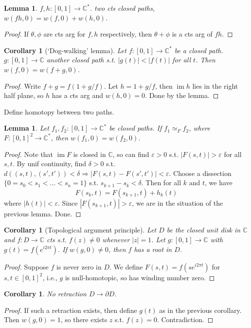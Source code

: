 \documentclass{article}
\theoremstyle{definition}
\theoremstyle{remark}
\theoremstyle{plain}
\newtheorem{lem}[defn]{Lemma}
\newtheorem{crly}[defn]{Corollary}
\newcommand{\CC}{\mathbb{C}}
\newcommand{\im}{\operatorname{im}}
\begin{document}
\begin{lem}
    $f,h:[0,1]\to\CC^\ast$. two cts closed paths, $w(fh,0)=w(f,0)+w(h,0)$.
\end{lem}
\begin{proof}
    If $\theta,\phi$ are cts arg for $f,h$ respectively, then $\theta+\phi$ is a cts arg of $fh$.
\end{proof}
\begin{crly}[`Dog-walking' lemma]
    Let $f:[0,1]\to\CC^\ast$ be a closed path. $g:[0,1]\to\CC$ another closed path s.t. $|g(t)|<|f(t)|$ for all $t$. Then $w(f,0)=w(f+g,0)$. 
\end{crly}
\begin{proof}
    Write $f+g=f(1+g/f)$. Let $h=1+g/f$, then $\im h$ lies in the right half plane, so $h$ has a cts arg and $w(h,0)=0$. Done by the lemma.
\end{proof}
Define homotopy between two paths.
\begin{lem}
    Let $f_1,f_2:[0,1]\to\CC^\ast$ be closed paths. If $f_1\simeq_F f_2$, where $F:[0,1]^2\to\CC^\ast$, then $w(f_1,0)=w(f_2,0)$.
\end{lem}
\begin{proof}
    Note that $\im F$ is closed in $\CC$, so can find $\varepsilon>0$ s.t. $|F(s,t)|>\varepsilon$ for all $s,t$. By unif continuity, find $\delta>0$ s.t. $d((s,t),(s',t'))<\delta\Rightarrow|F(s,t)-F(s',t')|<\varepsilon$. Choose a dissection $\{0=s_0<s_1<\ldots<s_n=1\}$ s.t. $s_{k+1}-s_k<\delta$. Then for all $k$ and $t$, we have
    \[F(s_k,t)=F(s_{k+1},t)+h_k(t)\]
    where $|h(t)|<\varepsilon$. Since $|F(s_{k+1},t)|>\varepsilon$, we are in the situation of the previous lemma. Done.
\end{proof}
\begin{crly}[Topological argument principle]
    Let $D$ be the closed unit disk in $\CC$ and $f:D\to \CC$ cts s.t. $f(z)\neq 0$ whenever $|z|=1$. Let $g:[0,1]\to\CC$ with $g(t)=f(e^{i2\pi t})$. If $w(g,0)\neq 0$, then $f$ has a root in $D$.
\end{crly}
\begin{proof}
    Suppose $f$ is never zero in $D$. We define $F(s,t)=f(se^{i2\pi t})$ for $s,t\in [0,1]^2$, i.e., $g$ is null-homotopic, so has winding number zero.
\end{proof}
\begin{crly}
    No retraction $D\to\partial D$.
\end{crly}
\begin{proof}
    If such a retraction exists, then define $g(t)$ as in the previous corollary. Then $w(g,0)=1$, so there exists $z$ s.t. $f(z)=0$. Contradiction.
\end{proof}
\end{document}
